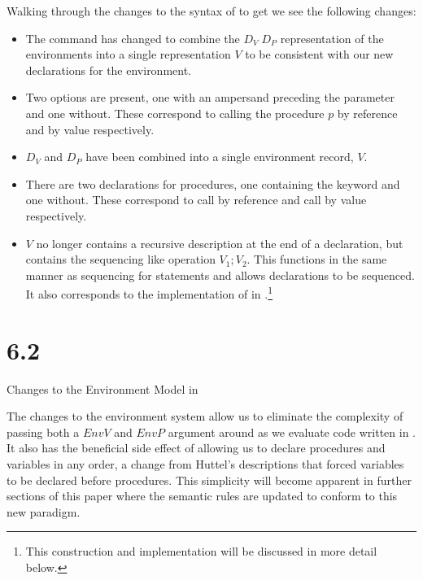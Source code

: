 \newpage

Walking through the changes to the syntax of  to get  we see the following changes:
\begin{itemize}
    \item The  command has changed to combine the $D_V \; D_P$ representation of the environments into a single representation $V$ to be consistent with our new declarations for the environment.

    \item Two  options are present, one with an ampersand preceding the parameter and one without. These correspond to calling the procedure $p$ by reference and by value respectively.

    \item $D_V$ and $D_P$ have been combined into a single environment record, $V$.

    \item There are two declarations for procedures, one containing the keyword  and one without. These correspond to call by reference and call by value respectively.

    \item $V$ no longer contains a recursive description at the end of a declaration, but contains the sequencing like operation $V_1;V_2$. This functions in the same manner as sequencing for statements and allows declarations to be sequenced. It also corresponds to the implementation of  in .\footnote{This construction and implementation will be discussed in more detail below.}
\end{itemize}

\section{6.2}{Changes to the Environment Model in }

The changes to the environment system allow us to eliminate the complexity of passing both a $EnvV$ and $EnvP$ argument around as we evaluate code written in . It also has the beneficial side effect of allowing us to declare procedures and variables in any order, a change from Huttel's descriptions that forced variables to be declared before procedures. This simplicity will become apparent in further sections of this paper where the semantic rules are updated to conform to this new paradigm. \par

